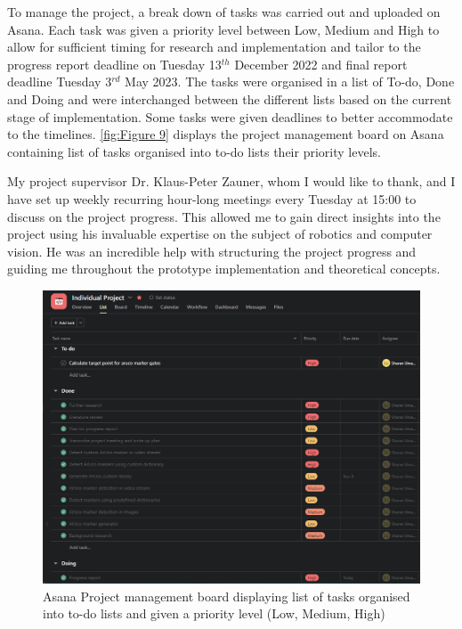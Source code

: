 \documentclass[12pt,a4paper]{report}
\begin{document}
To manage the project, a break down of tasks was carried out and uploaded on Asana. Each task was given a priority level between Low, Medium and High to allow for sufficient timing for research and implementation and tailor to the progress report deadline on Tuesday 13$^{th}$ December 2022 and final report deadline Tuesday 3$^{rd}$ May 2023. The tasks were organised in a list of To-do, Done and Doing and were interchanged between the different lists based on the current stage of implementation. Some tasks were given deadlines to better accommodate to the timelines. \autoref{fig:Figure 9} displays the project management board on Asana containing list of tasks organised into to-do lists their priority levels.

My project supervisor Dr. Klaus-Peter Zauner, whom I would like to thank, and I have set up weekly recurring hour-long meetings every Tuesday at 15:00 to discuss on the project progress. This allowed me to gain direct insights into the project using his invaluable expertise on the subject of robotics and computer vision. He was an incredible help with structuring the project progress and guiding me throughout the prototype implementation and theoretical concepts.

\begin{figure}[t]
    \includegraphics[width = 1\textwidth]{Images/Asana.png}
    \caption[Asana Project management board]{Asana Project management board displaying list of tasks organised into to-do lists and given a priority level (Low, Medium, High)}
    \label{fig:Figure 9}
\end{figure}

\newpage
\printbibliography[heading=bibintoc,title={References}] %
\end{document}
